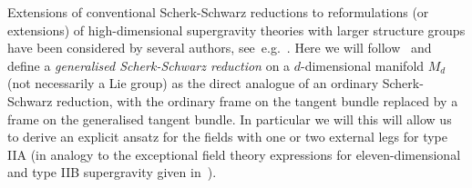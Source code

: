 \documentclass[debug]{phd}
\begin{document}
				Extensions of conventional Scherk-Schwarz reductions to reformulations (or extensions) of high-dimensional supergravity theories with larger structure groups have been considered by several authors, see~e.g.~\cite{Riccioni:2007au,Berman:2012uy,Aldazabal:2013mya,Godazgar:2013dma,spheres,Hohm:2014qga,Ciceri:2014wya,SamtExcReview,
Baguet:2015sma,Malek:2015hma}. 
				Here we will follow~\cite{spheres} and define a \emph{generalised Scherk-Schwarz reduction} on a $d$-dimensional manifold $M_d$ (not necessarily a Lie group) as the direct analogue of an ordinary Scherk-Schwarz reduction, with the ordinary frame on the tangent bundle replaced by a frame on the generalised tangent bundle.
				In particular we will this will allow us to derive an explicit ansatz for the fields with one or two external legs for type IIA (in analogy to the exceptional field theory expressions for eleven-dimensional and type IIB supergravity given in~\cite{Hohm:2014qga,SamtExcReview,Baguet:2015sma}).
				
\end{document}
